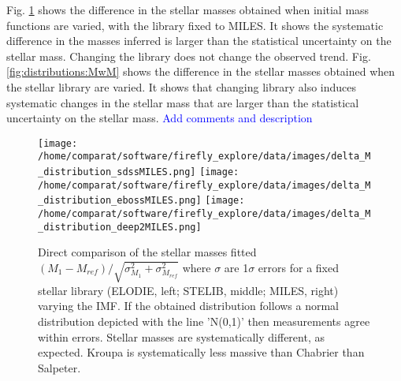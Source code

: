 \documentclass[onecolumn]{aa}
\begin{document}
Fig. \ref{fig:comparison:imfs:MS} shows the difference in the stellar masses obtained when initial mass functions are varied, with the library fixed to MILES. It shows the systematic difference in the masses inferred is larger than the statistical uncertainty on the stellar mass. Changing the library does not change the observed trend. 
Fig. \ref{fig:distributions:MwM} shows the difference in the stellar masses obtained when the stellar library are varied. It shows that changing library also induces systematic changes in the stellar mass that are larger than the statistical uncertainty on the stellar mass.
\textcolor{blue}{Add comments and description}


\begin{figure}
\begin{center}
\caption{\label{fig:comparison:imfs:MS} 
Direct comparison of the stellar masses fitted $(M_1-M_{ref})/\sqrt{\sigma^2_{M_1}+\sigma^2_{M_{ref}}}$ where $\sigma$ are 1$\sigma$ errors for a fixed stellar library (ELODIE, left; STELIB, middle; MILES, right) varying the IMF. If the obtained distribution follows a normal distribution depicted with the line 'N(0,1)' then measurements agree within errors. 
Stellar masses are systematically different, as expected. Kroupa is systematically less massive than Chabrier than Salpeter.}
\texttt{[image: /home/comparat/software/firefly\_explore/data/images/delta\_M\_distribution\_sdssMILES.png]}
\texttt{[image: /home/comparat/software/firefly\_explore/data/images/delta\_M\_distribution\_ebossMILES.png]}
\texttt{[image: /home/comparat/software/firefly\_explore/data/images/delta\_M\_distribution\_deep2MILES.png]}
\end{center}
\end{figure}
\end{document}
